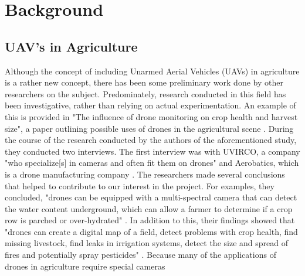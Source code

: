\section{Background}
\subsection{UAV's in Agriculture}
Although the concept of including Unarmed Aerial Vehicles (UAVs) in agriculture is a rather new concept, there has been some preliminary work done by other researchers on the subject.
Predominately, research conducted in this field has been investigative, rather than relying on actual experimentation.
An example of this is provided in "The influence of drone monitoring on crop health and harvest size", a paper outlining possible uses of drones in the agricultural scene \cite{Reinecke2017}.
During the course of the research conducted by the authors of the aforementioned study, they conducted two interviews. 
The first interview was with UVIRCO, a company "who specialize[s] in cameras and often fit them on drones" and Aerobatics, which is a drone manufacturing company \cite{Reinecke2017}.
The researchers made several conclusions that helped to contribute to our interest in the project.
For examples, they concluded, "drones can be equipped with a multi-spectral camera that can detect the water content underground, which can allow a farmer to determine if a crop row is parched or over-hydrated" \cite{Reinecke2017}.
In addition to this, their findings showed that "drones can create a digital map of a field, detect problems with crop health, find missing livestock, find leaks in irrigation systems, detect the size and spread of fires and potentially spray pesticides" \cite{Reinecke2017}.  
Because many of the applications of drones in agriculture require special cameras